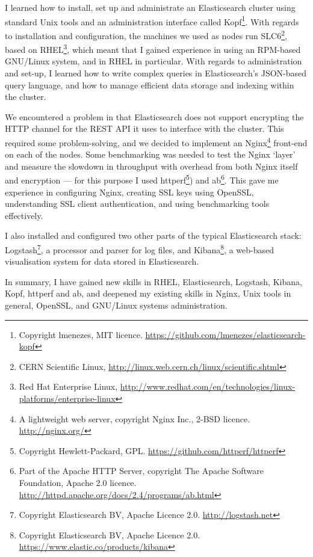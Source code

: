 \documentclass[a4paper,11pt]{article} %
\begin{document}
I learned how to install, set up and administrate an Elasticsearch cluster using standard Unix tools and an administration interface called Kopf\footnote{Copyright lmenezes, MIT licence.  \url{https://github.com/lmenezes/elasticsearch-kopf}}.  With regards to installation and configuration, the machines we used as nodes run SLC6\footnote{CERN Scientific Linux, \url{http://linux.web.cern.ch/linux/scientific.shtml}}, based on RHEL\footnote{Red Hat Enterprise Linux, \url{http://www.redhat.com/en/technologies/linux-platforms/enterprise-linux}}, which meant that I gained experience in using an RPM-based GNU/Linux system, and in RHEL in particular.  With regards to administration and set-up, I learned how to write complex queries in Elasticsearch's JSON-based query language, and how to manage efficient data storage and indexing within the cluster.

We encountered a problem in that Elasticsearch does not support encrypting the HTTP channel for the REST API it uses to interface with the cluster.  This required some problem-solving, and we decided to implement an Nginx\footnote{A lightweight web server, copyright Nginx Inc., 2-BSD licence.  \url{http://nginx.org/}} front-end on each of the nodes.  Some benchmarking was needed to test the Nginx `layer' and measure the slowdown in throughput with overhead from both Nginx itself and encryption --- for this purpose I used httperf\footnote{Copyright Hewlett-Packard, GPL.  \url{https://github.com/httperf/httperf}}) and ab\footnote{Part of the Apache HTTP Server, copyright The Apache Software Foundation, Apache 2.0 licence.  \url{http://httpd.apache.org/docs/2.4/programs/ab.html}}.  This gave me experience in configuring Nginx, creating SSL keys using OpenSSL, understanding SSL client authentication, and using benchmarking tools effectively.

I also installed and configured two other parts of the typical Elasticsearch stack: Logstash\footnote{Copyright Elasticsearch BV, Apache Licence 2.0.  \url{http://logstash.net}}, a processor and parser for log files, and Kibana\footnote{Copyright Elasticsearch BV, Apache Licence 2.0.  \url{https://www.elastic.co/products/kibana}}, a web-based visualisation system for data stored in Elasticsearch.

In summary, I have gained new skills in RHEL, Elasticsearch, Logstash, Kibana, Kopf, httperf and ab, and deepened my existing skills in Nginx, Unix tools in general, OpenSSL, and GNU/Linux systems administration.
\end{document}
